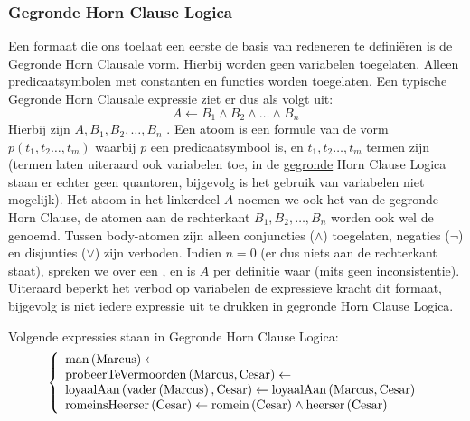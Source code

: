 \subsubsection{Gegronde Horn Clause Logica}
\label{sss:gegrondeHornClausaleLogic}
Een formaat die ons toelaat een eerste de basis van redeneren te definiëren is de Gegronde Horn Clausale vorm. Hierbij worden geen variabelen toegelaten. Alleen predicaatsymbolen met constanten en functies worden toegelaten. Een typische Gegronde Horn Clausale expressie ziet er dus als volgt uit:
\begin{equation}
A\leftarrow B_1\wedge B_2\wedge\ldots\wedge B_n
\end{equation}
Hierbij zijn $A,B_1,B_2,\ldots,B_n$ . Een atoom is een formule van de vorm $p\left(t_1,t_2\ldots,t_m\right)$ waarbij $p$ een predicaatsymbool is, en $t_1,t_2\ldots,t_m$ termen zijn (termen laten uiteraard ook variabelen toe, in de \underline{gegronde} Horn Clause Logica staan er echter geen quantoren, bijgevolg is het gebruik van variabelen niet mogelijk). Het atoom in het linkerdeel $A$ noemen we ook het  van de gegronde Horn Clause, de atomen aan de rechterkant $B_1,B_2,\ldots,B_n$ worden ook wel de  genoemd. Tussen body-atomen zijn alleen conjuncties ($\wedge$) toegelaten, negaties ($\neg$) en disjunties ($\vee$) zijn verboden. Indien $n=0$ (er dus niets aan de rechterkant staat), spreken we over een , en is $A$ per definitie waar (mits geen inconsistentie). Uiteraard beperkt het verbod op variabelen de expressieve kracht dit formaat, bijgevolg is niet iedere expressie uit te drukken in gegronde Horn Clause Logica.
\begin{leftbar}
Volgende expressies staan in Gegronde Horn Clause Logica:
\begin{equation}
\left\{\begin{array}{l}
\mbox{man}\left( \mbox{Marcus} \right)\leftarrow\\
\mbox{probeerTeVermoorden}\left( \mbox{Marcus},\mbox{Cesar} \right)\leftarrow\\
\mbox{loyaalAan}\left( \mbox{vader}\left( \mbox{Marcus} \right),\mbox{Cesar} \right)\leftarrow\mbox{loyaalAan}\left( \mbox{Marcus},\mbox{Cesar} \right)\\
\mbox{romeinsHeerser}\left( \mbox{Cesar} \right)\leftarrow\mbox{romein}\left( \mbox{Cesar} \right)\wedge\mbox{heerser}\left( \mbox{Cesar} \right)
\end{array}\right.
\end{equation}
\end{leftbar}
